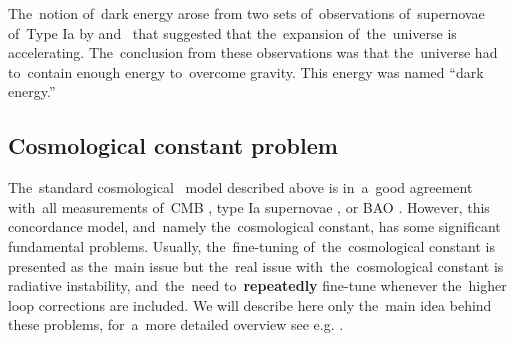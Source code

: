 The~notion of~dark energy arose from two sets of~observations of~supernovae of~Type Ia by \textcite{riess} and~\textcite{1999ApJ...517..565P} that suggested that the~expansion of~the~universe is accelerating. The~conclusion from these observations was that the~universe had to~contain enough energy to~overcome gravity. This energy was named “dark energy.”

\subsection{Cosmological constant problem}
\label{ssec:lambda}
The~standard cosmological \LCDM\ model described above is in~a~good agreement with~all measurements of~CMB \parencite{planck_cosm}, type Ia supernovae \parencite{Abbott_2019}, or BAO \parencite{BAO_results}. However, this concordance model, and~namely the~cosmological constant, has some significant fundamental problems. Usually, the~fine-tuning of~the~cosmological constant is presented as the~main issue but the~real issue with~the~cosmological constant is radiative instability, and~the~need to~\textbf{repeatedly} fine-tune whenever the~higher loop corrections are included. We will describe here only the~main idea behind these problems, for~a~more detailed overview see e.g. \textcite{2015arXiv150205296P,2012CRPhy..13..566M}.

